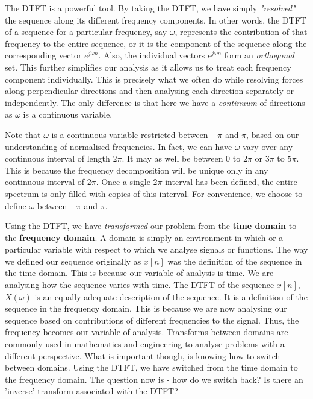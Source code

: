 \documentclass{article}
\theoremstyle{definition}
\begin{document}
The DTFT is a powerful tool. By taking the DTFT, we have simply \textit{"resolved"} the sequence along its different frequency components. In other words, the DTFT of a sequence for a particular frequency, say $\omega$, represents the contribution of that frequency to the entire sequence, or it is the component of the sequence along the corresponding vector $e^{j\omega n}$. Also, the individual vectors $e^{j\omega n}$ form an \textit{orthogonal} set. This further simplifies our analysis as it allows us to treat each frequency component individually. This is precisely what we often do while resolving forces along perpendicular directions and then analysing each direction separately or independently. The only difference is that here we have a \textit{continuum} of directions as $\omega$ is a continuous variable. \smallskip

Note that $\omega$ is a continuous variable restricted between $-\pi$ and $\pi$, based on our understanding of normalised frequencies. In fact, we can have $\omega$ vary over any continuous interval of length $2\pi$. It may as well be between $0$ to $2\pi$ or $3\pi$ to $5\pi$. This is because the frequency decomposition will be unique only in any continuous interval of $2\pi$. Once a single $2\pi$ interval has been defined, the entire spectrum is only filled with copies of this interval. For convenience, we choose to define $\omega$ between $-\pi$ and $\pi$. \smallskip

Using the DTFT, we have \textit{transformed} our problem from the \textbf{time domain} to the \textbf{frequency domain}. A domain is simply an environment in which or a particular variable with respect to which we analyse signals or functions. The way we defined our sequence originally as $x[n]$ was the definition of the sequence in the time domain. This is because our variable of analysis is time. We are analysing how the sequence varies with time. The DTFT of the sequence $x[n]$, $X(\omega)$ is an equally adequate description of the sequence. It is a definition of the sequence in the frequency domain. This is because we are now analysing our sequence based on contributions of different frequencies to the signal. Thus, the frequency becomes our variable of analysis. Transforms between domains are commonly used in mathematics and engineering to analyse problems with a different perspective. What is important though, is knowing how to switch between domains. Using the DTFT, we have switched from the time domain to the frequency domain. The question now is - how do we switch back? Is there an 'inverse' transform associated with the DTFT?
\end{document}
